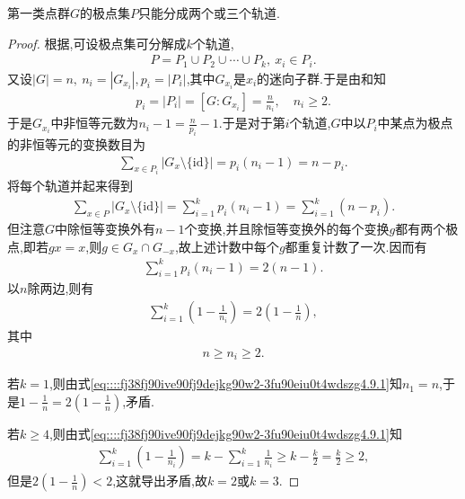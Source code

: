 \documentclass[../../main.tex]{subfiles}%
\begin{document}
\begin{theorem}
第一类点群$G$的极点集$P$只能分成两个或三个轨道.
\end{theorem}
\begin{proof}
根据,可设极点集可分解成$k$个轨道,
\begin{align*}
P=P_1\cup P_2\cup\cdots\cup P_k,\ x_i\in P_i.
\end{align*}
又设$|G|=n,\ n_i=|G_{x_i}|,p_i=|P_i|$,其中$G_{x_i}$是$x_i$的迷向子群.于是由和知
\begin{align*}
p_i=|P_i|=[G:G_{x_i}]=\frac{n}{n_i},\quad n_i\geqslant 2.
\end{align*}
于是$G_{x_i}$中非恒等元数为$n_i-1=\frac{n}{p_i}-1$.于是对于第$i$个轨道,$G$中以$P_i$中某点为极点的非恒等元的变换数目为
\begin{align*}
\sum\limits_{x\in P_i}|G_x\setminus\{\text{id}\}|=p_i(n_i-1)=n-p_i.
\end{align*}
将每个轨道并起来得到
\begin{align*}
\sum_{x\in P}{|G_x\setminus \{\mathrm{id}\}|}=\sum\limits_{i=1}^k p_i(n_i-1)=\sum\limits_{i=1}^k(n-p_i).
\end{align*}
但注意$G$中除恒等变换外有$n-1$个变换,并且除恒等变换外的每个变换$g$都有两个极点,即若$gx=x$,则$g\in G_x\cap G_{-x}$,故上述计数中每个$g$都重复计数了一次.因而有
\begin{align*}
\sum\limits_{i=1}^k p_i(n_i-1)=2(n-1).
\end{align*}
以$n$除两边,则有
\begin{align}
\sum\limits_{i=1}^k\left(1-\frac{1}{n_i}\right)=2\left(1-\frac{1}{n}\right),\label{eq::::fj38fj90ive90fj9dejkg90w2-3fu90eiu0t4wdszg4.9.1}
\end{align}
其中
\begin{align*}
n\geqslant n_i\geqslant 2.
\end{align*}

若$k=1$,则由式\eqref{eq::::fj38fj90ive90fj9dejkg90w2-3fu90eiu0t4wdszg4.9.1}知$n_1=n$,于是$1-\frac{1}{n}=2\left(1-\frac{1}{n}\right)$,矛盾.

若$k\geqslant 4$,则由式\eqref{eq::::fj38fj90ive90fj9dejkg90w2-3fu90eiu0t4wdszg4.9.1}知
\begin{align*}
\sum\limits_{i=1}^k\left(1-\frac{1}{n_i}\right)=k-\sum\limits_{i=1}^k\frac{1}{n_i}\geqslant k-\frac{k}{2}=\frac{k}{2}\geqslant 2,
\end{align*}
但是$2\left(1-\frac{1}{n}\right)<2$,这就导出矛盾,故$k=2$或$k=3$.

\end{proof}
\end{document}
